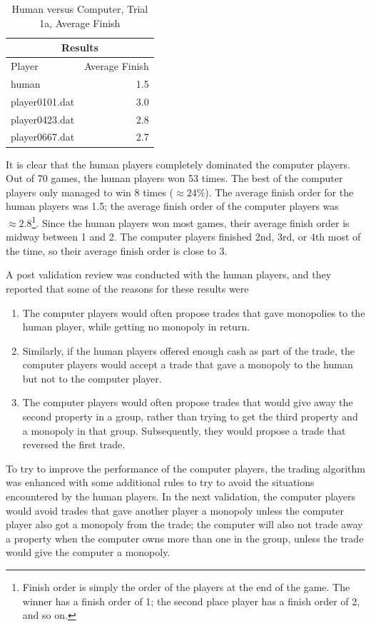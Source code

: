 \begin{table}[htbp]
  \centering
  \caption{Human versus Computer, Trial 1a, Average Finish}
    \begin{tabular}{lr}
    \toprule
    \multicolumn{2}{c}{Results} \\
    \midrule
    Player & Average Finish \\
    \multicolumn{1}{l}{human} & 1.5 \\
    \multicolumn{1}{l}{player0101.dat} & 3.0 \\
    \multicolumn{1}{l}{player0423.dat} & 2.8 \\
    \multicolumn{1}{l}{player0667.dat} & 2.7 \\
    \bottomrule
    \end{tabular}%
  \label{tab:human_results1b}%
\end{table}%

It is clear that the human players completely dominated the computer players.
Out of 70 games, the human players won 53 times. The best of the computer
players only managed to win 8 times (\(\approx24\%\)). The average finish order
for the human players was 1.5; the average finish order of the computer players
was \(\approx2.8\)\footnote{Finish order is simply the order of the players at
the end of the game. The winner has a finish order of 1; the second place player
has a finish order of 2, and so on.}. Since the human players won most games,
their average finish order is midway between 1 and 2. The computer players
finished 2nd, 3rd, or 4th most of the time, so their average finish order is
close to 3.

A post validation review was conducted with the human players, and they reported
that some of the reasons for these results were
\begin{enumerate}
  \item {The computer players would often propose trades that gave monopolies to 
  the human player, while getting no monopoly in return.} 
  \item {Similarly, if the human players offered enough cash as part of the 
  trade, the computer players would accept a trade that gave a monopoly to the 
  human but not to the computer player.} 
  \item {The computer players would often propose trades that would give away 
  the second property in a group, rather than trying to get the third property 
  and a monopoly in that group. Subsequently, they would propose a trade that
  reversed the first trade.}
\end{enumerate}
To try to improve the performance of the computer players, the trading algorithm 
was enhanced with some additional rules to try to avoid the situations 
encountered by the human players. In the next validation, the computer players
would avoid trades that gave another player a monopoly unless the computer 
player also got a monopoly from the trade; the computer will also not trade away
a property when the computer owns more than one in the group, unless the trade
would give the computer a monopoly.

